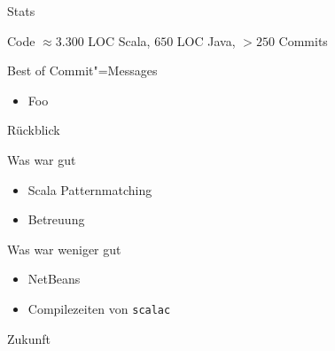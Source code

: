 \documentclass[hyperref={pdfpagelabels=false}]{beamer}
\begin{document}
\begin{frame}{Stats}
  \begin{block}{Code}
    $\approx 3.300$ LOC Scala, $650$ LOC Java, $> 250$ Commits
  \end{block}
  \begin{block}{Best of Commit"=Messages}
    \begin{itemize}
      \item Foo
    \end{itemize}
  \end{block}
\end{frame}

\begin{frame}{Rückblick}
  \begin{exampleblock}{Was war gut}
    \begin{itemize}
      \item Scala Patternmatching
      \item Betreuung \smiley
    \end{itemize}
  \end{exampleblock}
  \begin{alertblock}{Was war weniger gut}
    \begin{itemize}
      \item NetBeans
      \item Compilezeiten von \texttt{scalac}
    \end{itemize}
  \end{alertblock}
\end{frame}

\begin{frame}{Zukunft}
\end{frame}
\end{document}
